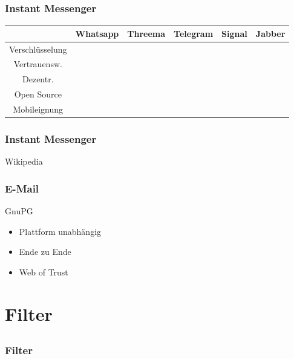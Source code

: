 \documentclass[12pt, table]{beamer}
\begin{document}
\begin{frame}
	\frametitle{Instant Messenger}
	\begin{tabular}{cccccc}
    \hline
      & Whatsapp & Threema & Telegram & Signal & Jabber \\
    \hline
      Verschlüsselung & \cellcolor{green} & \cellcolor{yellow} & \cellcolor{orange} & \cellcolor{green} & \cellcolor{green} \\
    \hline
      Vertrauensw. & \cellcolor{red} & \cellcolor{yellow} & \cellcolor{orange} & \cellcolor{green} & \cellcolor{green} \\
    \hline
      Dezentr. & \cellcolor{red} & \cellcolor{red} & \cellcolor{red} & \cellcolor{orange} & \cellcolor{green} \\
    \hline
      Open Source & \cellcolor{red} & \cellcolor{orange} & \cellcolor{yellow} & \cellcolor{green} & \cellcolor{green} \\
    \hline
      Mobileignung & \cellcolor{green} & \cellcolor{green} & \cellcolor{green} & \cellcolor{green} & \cellcolor{green} \\
    \hline
    \end{tabular}
\end{frame}

\begin{frame}
	\frametitle{Instant Messenger}
	Wikipedia
\end{frame}

\begin{frame}
	\frametitle{E-Mail}
	GnuPG
	\begin{itemize}
		\item Plattform unabhängig
		\item Ende zu Ende
		\item Web of Trust
	\end{itemize}
\end{frame}

\section{Filter}
\subsection{}

\begin{frame}
	\frametitle{Filter}
\end{frame}
\end{document}
